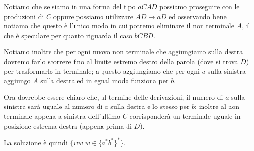 \documentclass[class=book, crop=false, oneside]{standalone}
\begin{document}
Notiamo che se siamo in una forma del tipo $aCAD$ possiamo proseguire con le produzioni di $C$ oppure possiamo utilizzare $AD \to aD$ ed osservando bene notiamo che questo è l'unico modo in cui potremo eliminare il non terminale $A$, il che è speculare per quanto riguarda il caso $bCBD$.

Notiamo inoltre che per ogni nuovo non terminale che aggiungiamo sulla destra dovremo farlo scorrere fino al limite estremo destro della parola (dove si trova $D$) per trasformarlo in terminale; a questo aggiungiamo che per ogni $a$ sulla sinistra aggiungo $A$ sulla destra ed in egual modo funziona per $b$.

Ora dovrebbe essere chiaro che, al termine delle derivazioni, il numero di $a$ sulla sinistra  sarà uguale al numero di $a$ sulla destra e lo stesso per $b$; inoltre al non terminale appena a sinistra dell'ultimo $C$ corrisponderà un terminale uguale in posizione estrema destra (appena prima di $D$).

La soluzione è quindi $\{ ww | w \in \{a^* b^*\}^*\}$.
\end{document}
